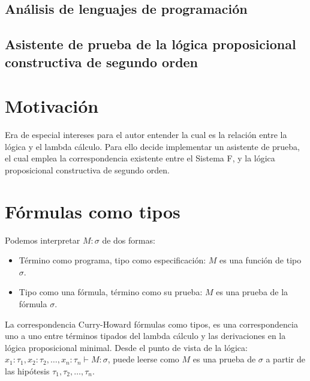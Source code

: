 \documentclass[a4paper,11pt]{article}
\title{}
\author{}
\theoremstyle{definition}
\begin{document}
\maketitle 

\begin{center}
\section*{Análisis de lenguajes de programación} 
\subsection*{Asistente de prueba de la lógica proposicional constructiva de segundo orden}
\end{center}

\newpage{\pagestyle{empty}\cleardoublepage}


\section{Motivación}
Era de especial intereses para el autor entender la cual es la relación entre la lógica y el lambda cálculo.
Para ello decide implementar un asistente de prueba, el cual emplea la correspondencia
existente entre el Sistema F, y la lógica proposicional constructiva de segundo orden.
 
\section{Fórmulas como tipos}
Podemos interpretar $M : \sigma$ de dos formas:
\begin{itemize}
  \item Término como programa, tipo como especificación: $M$ es una función de tipo $\sigma$.
  \item Tipo como una fórmula, término como su prueba: $M$ es una prueba de la fórmula $\sigma$.
\end{itemize}

La correspondencia Curry-Howard fórmulas como tipos, es una correspondencia uno a uno entre términos
tipados del lambda cálculo y las derivaciones en la lógica proposicional minimal.
Desde el punto de vista de la lógica: $x_{1}:\tau_{1}, x_{2}:\tau_{2}, \ldots, x_{n}:\tau_{n} \vdash M : \sigma$,
puede leerse como $M$ es una prueba de $\sigma$ a partir de las hipótesis $\tau_{1}, \tau_{2}, \ldots, \tau_{n}$.  
 
\end{document}
